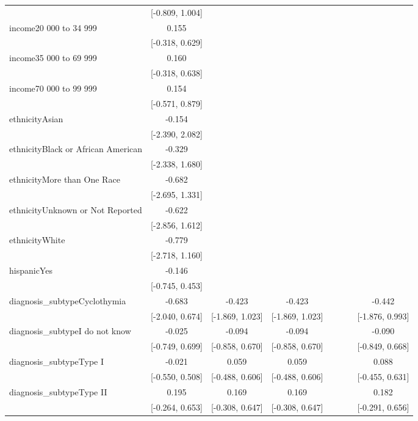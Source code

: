 \begin{tiny}
\begin{xltabular}{\textwidth}{lccccccc}
 & [-0.809, 1.004] &  &  &  &  &  &  \\ 
income20 000 to 34 999 & 0.155 &  &  &  &  &  &  \\ 
 & [-0.318, 0.629] &  &  &  &  &  &  \\ 
income35 000 to 69 999 & 0.160 &  &  &  &  &  &  \\ 
 & [-0.318, 0.638] &  &  &  &  &  &  \\ 
income70 000 to 99 999 & 0.154 &  &  &  &  &  &  \\ 
 & [-0.571, 0.879] &  &  &  &  &  &  \\ 
ethnicityAsian & -0.154 &  &  &  &  &  &  \\ 
 & [-2.390, 2.082] &  &  &  &  &  &  \\ 
ethnicityBlack or African American & -0.329 &  &  &  &  &  &  \\ 
 & [-2.338, 1.680] &  &  &  &  &  &  \\ 
ethnicityMore than One Race & -0.682 &  &  &  &  &  &  \\ 
 & [-2.695, 1.331] &  &  &  &  &  &  \\ 
ethnicityUnknown or Not Reported & -0.622 &  &  &  &  &  &  \\ 
 & [-2.856, 1.612] &  &  &  &  &  &  \\ 
ethnicityWhite & -0.779 &  &  &  &  &  &  \\ 
 & [-2.718, 1.160] &  &  &  &  &  &  \\ 
hispanicYes & -0.146 &  &  &  &  &  &  \\ 
 & [-0.745, 0.453] &  &  &  &  &  &  \\ 
diagnosis\_subtypeCyclothymia & -0.683 & -0.423 & -0.423 &  &  &  & -0.442 \\ 
 & [-2.040, 0.674] & [-1.869, 1.023] & [-1.869, 1.023] &  &  &  & [-1.876, 0.993] \\ 
diagnosis\_subtypeI do not know & -0.025 & -0.094 & -0.094 &  &  &  & -0.090 \\ 
 & [-0.749, 0.699] & [-0.858, 0.670] & [-0.858, 0.670] &  &  &  & [-0.849, 0.668] \\ 
diagnosis\_subtypeType I & -0.021 & 0.059 & 0.059 &  &  &  & 0.088 \\ 
 & [-0.550, 0.508] & [-0.488, 0.606] & [-0.488, 0.606] &  &  &  & [-0.455, 0.631] \\ 
diagnosis\_subtypeType II & 0.195 & 0.169 & 0.169 &  &  &  & 0.182 \\ 
 & [-0.264, 0.653] & [-0.308, 0.647] & [-0.308, 0.647] &  &  &  & [-0.291, 0.656] \\ 

\end{xltabular}
\end{tiny}
